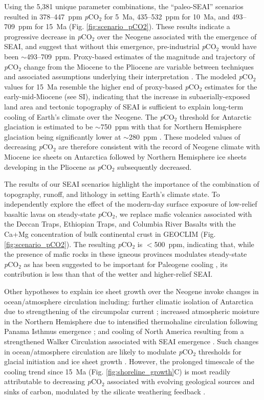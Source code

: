 \documentclass[11pt,letterpaper]{article}
\newcommand{\pCOtwo}{\textit{p}CO$_{2}$\xspace}
\begin{document}
Using the 5,381 unique parameter combinations, the ``paleo-SEAI'' scenarios resulted in 378--447~ppm \pCOtwo for 5~Ma, 435--532~ppm for 10~Ma, and 493--709~ppm for 15~Ma (Fig. \ref{fig:scenario_pCO2}). These results indicate a progressive decrease in \pCOtwo over the Neogene associated with the emergence of SEAI, and suggest that without this emergence, pre-industrial \pCOtwo would have been $\sim$493--709~ppm. Proxy-based estimates of the magnitude and trajectory of \pCOtwo change from the Miocene to the Pliocene are variable between techniques and associated assumptions underlying their interpretation \cite{Foster2017a}. The modeled \pCOtwo values for 15~Ma resemble the higher end of proxy-based \pCOtwo estimates for the early-mid-Miocene (see SI), indicating that the increase in subaerially-exposed land area and tectonic topography of SEAI is sufficient to explain long-term cooling of Earth's climate over the Neogene. The \pCOtwo threshold for Antarctic glaciation is estimated to be $\sim$750~ppm with that for Northern Hemisphere glaciation being significantly lower at $\sim$280~ppm \cite{DeConto2008a}. These modeled values of decreasing \pCOtwo are therefore consistent with the record of Neogene climate with Miocene ice sheets on Antarctica \cite{Sugden1995a} followed by Northern Hemisphere ice sheets developing in the Pliocene \cite{Haug2005a} as \pCOtwo subsequently decreased.

The results of our SEAI scenarios highlight the importance of the combination of topography, runoff, and lithology in setting Earth's climate state. To independently explore the effect of the modern-day surface exposure of low-relief basaltic lavas on steady-state \pCOtwo \cite{Kent2013a}, we replace mafic volcanics associated with the Deccan Traps, Ethiopian Traps, and Columbia River Basalts with the Ca+Mg concentration of bulk continental crust in GEOCLIM (Fig. \ref{fig:scenario_pCO2}). The resulting \pCOtwo is $<$500~ppm, indicating that, while the presence of mafic rocks in these igneous provinces modulates steady-state \pCOtwo as has been suggested to be important for Paleogene cooling \cite{Kent2013a}, its contribution is less than that of the wetter and higher-relief SEAI.

Other hypotheses to explain ice sheet growth over the Neogene invoke changes in ocean/atmosphere circulation including: further climatic isolation of Antarctica due to strengthening of the circumpolar current \cite{Shevenell2004a}; increased atmospheric moisture in the Northern Hemisphere due to intensified thermohaline circulation following Panama Isthmus emergence \cite{Haug1998a}; and cooling of North America resulting from a strengthened Walker Circulation associated with SEAI emergence \cite{Molnar2015a}. Such changes in ocean/atmosphere circulation are likely to modulate \pCOtwo thresholds for glacial initiation and ice sheet growth \cite{DeConto2008a}. However, the prolonged timescale of the cooling trend since 15~Ma (Fig. \ref{fig:shoreline_growth}C) is most readily attributable to decreasing \pCOtwo associated with evolving geological sources and sinks of carbon, modulated by the silicate weathering feedback \cite{Kump1997a}.
\end{document}
